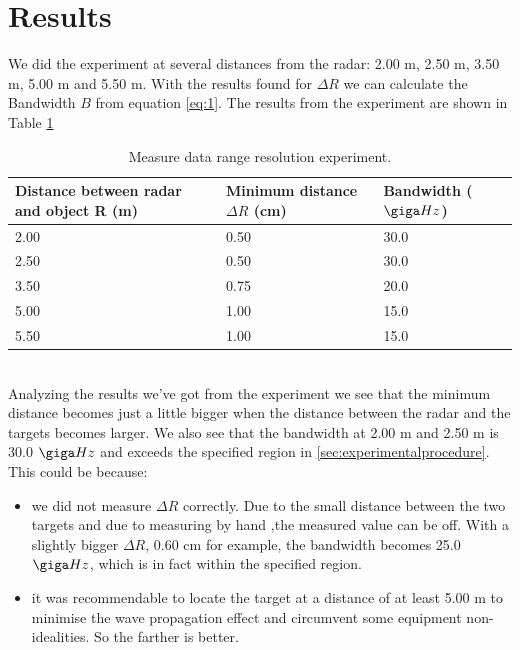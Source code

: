 \documentclass[final]{scrreprt} %
\begin{document}
\section{Results}
We did the experiment at several distances from the radar: 2.00 \unit{m}, 2.50 \unit{m}, 3.50 \unit{m}, 5.00 \unit{m} and 5.50 \unit{m}. 
With the results found for $\Delta R$ we can calculate the Bandwidth $B$ from equation \ref{eq:1}.
The results from the experiment are shown in Table \ref{tab:2}
\begin{table}[h]
\begin{center}
\begin{tabular}{ | l | l | l | }
    \hline
    Distance between radar and object R (m) & Minimum distance $\Delta R$ (cm) & Bandwidth ($\giga Hz$)  \\\hline
    2.00 & 0.50 & 30.0 \\\hline
    2.50 & 0.50 & 30.0 \\\hline
    3.50 & 0.75 & 20.0  \\\hline
    5.00 & 1.00 & 15.0  \\\hline
    5.50 & 1.00 & 15.0  \\\hline
\end{tabular}
\caption{Measure data range resolution experiment.}
\label{tab:2}
\end{center}
\end{table}
\\


Analyzing the results we've got from the experiment we see that the minimum distance becomes just a little bigger when the distance between the radar and the targets becomes larger.
We also see that the bandwidth at 2.00 \unit{m} and 2.50 \unit{m} is 30.0 $\giga Hz$ and exceeds the specified region in \ref{sec:experimentalprocedure}.
This could be because:
\begin{itemize}
\item we did not measure $\Delta R$ correctly. 
Due to the small distance between the two targets and due to measuring by hand ,the measured value can be off. 
With a slightly bigger $\Delta R$, 0.60 \unit{\centi m} for example, the bandwidth becomes  25.0 $\giga Hz$,  which is in fact within the specified region.
\item it was recommendable to locate the target at a distance of at least 5.00 \unit{m} to minimise the wave propagation effect and circumvent some equipment non-idealities.
 So the farther is better.
\end{itemize}
\end{document}
